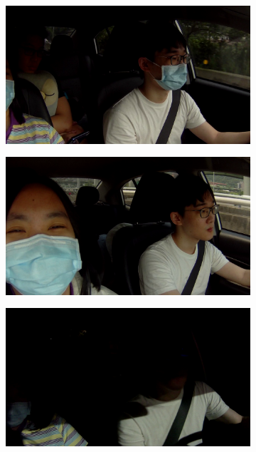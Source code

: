 \begin{figure}[t]
\centering
\begin{subfigure}[b]{0.22\textwidth}
    \includegraphics[width=\textwidth]{figures/car_1}
\end{subfigure}
\begin{subfigure}[b]{0.22\textwidth}
    \includegraphics[width=\textwidth]{figures/car_2}
\end{subfigure}
\begin{subfigure}[b]{0.22\textwidth}
    \includegraphics[width=\textwidth]{figures/car_3}

\end{subfigure}
\end{figure}
